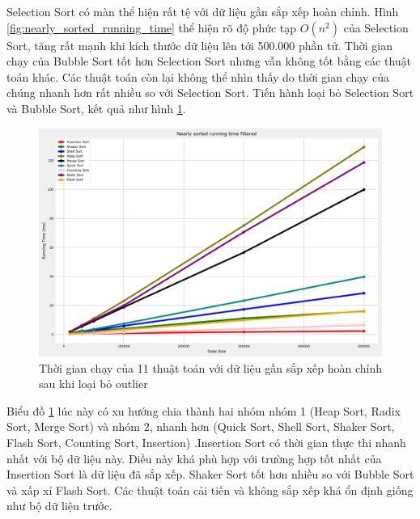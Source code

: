 Selection Sort có màn thể hiện rất tệ với dữ liệu gần sắp xếp hoàn chỉnh. Hình \ref{fig:nearly_sorted_running_time} thể hiện rõ độ phức tạp $O(n^2)$ của Selection Sort, tăng rất mạnh khi kích thước dữ liệu lên tới 500.000 phần tử. Thời gian chạy của Bubble Sort tốt hơn Selection Sort nhưng vẫn không tốt bằng các thuật toán khác. Các thuật toán còn lại không thể nhìn thấy do thời gian chạy của chúng nhanh hơn rất nhiều so với Selection Sort. Tiến hành loại bỏ Selection Sort và Bubble Sort, kết quả như hình \ref{fig:nearly_sorted_running_time_filtered}.


\begin{figure}[H]
    \centering
    \includegraphics[width=\textwidth]{experimental_result/images/nearly_sorted_running_time_filtered.png}
    \caption{Thời gian chạy của 11 thuật toán với dữ liệu gần sắp xếp hoàn chỉnh sau khi loại bỏ outlier}
    \label{fig:nearly_sorted_running_time_filtered}
\end{figure}

Biểu đồ \ref{fig:nearly_sorted_running_time_filtered} lúc này có xu hướng chia thành hai nhóm nhóm 1 (Heap Sort, Radix Sort, Merge Sort) và nhóm 2, nhanh hơn (Quick Sort, Shell Sort, Shaker Sort, Flash Sort, Counting Sort, Insertion) .Insertion Sort có thời gian thực thi nhanh nhất với bộ dữ liệu này. Điều này khá phù hợp với trường hợp tốt nhất của Insertion Sort là dữ liệu đã sắp xếp. Shaker Sort tốt hơn nhiều so với Bubble Sort và xấp xỉ Flash Sort. Các thuật toán cải tiến và không sắp xếp khá ổn định giống như bộ dữ liệu trước.



